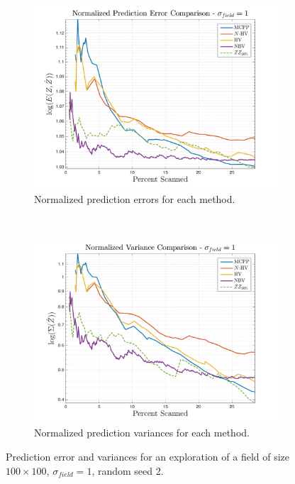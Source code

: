 \begin{figure}[htb!]
    \centering
    \begin{subfigure}[t]{0.75\textwidth}
        \centering
        \includegraphics[width=\linewidth]{figures/normalized_errors_30p_100x100_sf_1_seed_2_app_10.png}
        \captionsetup{skip=0.20\baselineskip,size=footnotesize}
        \caption{Normalized prediction errors for each method.}
    \end{subfigure}%
    \\
    \begin{subfigure}[t]{0.75\textwidth}
        \centering
        \includegraphics[width=\linewidth]{figures/normalized_variances_30p_100x100_sf_1_seed_2_app_10.png}
        \captionsetup{skip=0.20\baselineskip,size=footnotesize}
        \caption{Normalized prediction variances for each method.}
    \end{subfigure}%
    \captionsetup{skip=0.20\baselineskip}
    \caption{Prediction error and variances for an exploration of a field of size $100 \times 100$, $\sigma_{field} = 1$, random seed 2.}
    \label{fig:errvar1}
\end{figure}
\clearpage